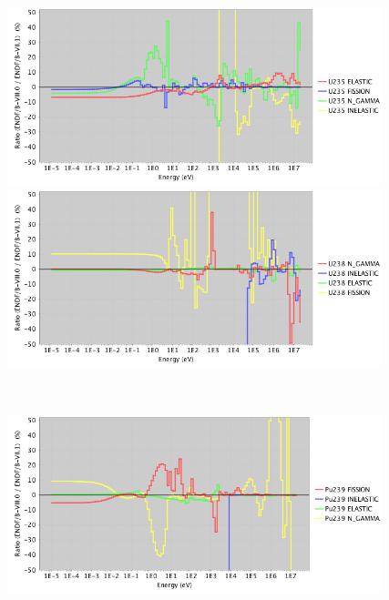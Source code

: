 \documentclass[letterpaper]{ar-1col}
\begin{document}
\begin{figure}
    \centering
    \begin{minipage}{0.5\textwidth}
        \centering
        \includegraphics[width=0.97\textwidth]{u235.png} %
    \end{minipage}\hfill
    \begin{minipage}{0.5\textwidth}
        \centering
        \includegraphics[width=0.97\textwidth]{u238.png} %
    \end{minipage}
    \\
    \centering
    \begin{minipage}{0.5\textwidth}
        \centering
        \includegraphics[width=0.97\textwidth]{pu239_1.png} %

\end{minipage}
\end{figure}
\end{document}
